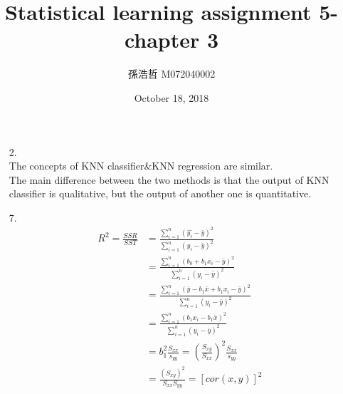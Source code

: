 \documentclass[12pt]{article}
\title{Statistical learning assignment 5- chapter 3}
\author{孫浩哲 \hspace{0.7cm} M072040002}
\date{October 18, 2018}
\begin{document}
\maketitle
\begin{itemize}
\item[2.]\ \\
The concepts of KNN classifier\&KNN regression are similar.\\[2ex]
The main difference between the two methods is that the output of KNN classifier is qualitative, but the output of another one is quantitative. 
\item[7.]\ \\
\begin{align*}
R^2=\frac{SSR}{SST}
&=\frac{\sum_{i=1}^{n}(\hat{y_{i}}-\bar{y})^2}{\sum_{i=1}^{n}(y_{i}-\bar{y})^2}\\
&=\frac{\sum_{i=1}^{n}(b_{0}+b_{1}x_{i}-\bar{y})^2}{\sum_{i=1}^{n}(y_{i}-\bar{y})^2}\\
&=\frac{\sum_{i=1}^{n}(\bar{y}-b_{1}\bar{x}+b_{1}x_{i}-\bar{y})^2}{\sum_{i=1}^{n}(y_{i}-\bar{y})^2}\\
&=\frac{\sum_{i=1}^{n}(b_{1}x_{i}-b_{1}\bar{x})^2}{\sum_{i=1}^{n}(y_{i}-\bar{y})^2}\\
&=b_{1}^2\frac{S_{xx}}{s_{yy}}=(\frac{S_{xy}}{S_{xx}})^2\frac{S_{xx}}{s_{yy}}\\
&=\frac{(S_{xy})^2}{S_{xx}{S_{yy}}}=[cor(x,y)]^2
\end{align*}
\end{itemize}
\end{document}
